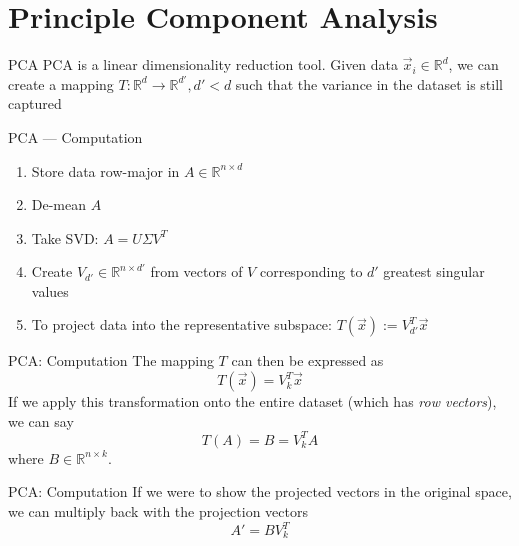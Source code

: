 
	\section{Principle Component Analysis}

	\begin{frame}{PCA}
	PCA is a linear dimensionality reduction tool. Given data $\vec{x}_i \in \mathbb{R}^d$, we can create a mapping $T : \mathbb{R}^d \rightarrow \mathbb{R}^{d'}, d' < d$ such that the variance in the dataset is still captured
	\end{frame}

	\begin{frame}{PCA --- Computation}
		\begin{enumerate}[<+->]
			\item Store data row-major in $A \in \mathbb{R}^{n \times d}$
			\item De-mean $A$
			\item Take SVD: $A = U \Sigma V^T$
			\item Create $V_{d'} \in \mathbb{R}^{n \times d'}$ from vectors of $V$ corresponding to $d'$ greatest singular values
			\item To project data into the representative subspace: $T(\vec{x}) := V_{d'}^T \vec{x}$
		\end{enumerate}
	\end{frame}

	\begin{frame}{PCA: Computation}
	The mapping $T$ can then be expressed as
	\[ T(\vec{x}) = V_k^T \vec{x} \]
	If we apply this transformation onto the entire dataset (which has \emph{row vectors}), we can say
	\[ T(A) = B = V_k^T A\]
	where $B \in \mathbb{R}^{n \times k}$.
	\end{frame}
	\begin{frame}{PCA: Computation}
	If we were to show the projected vectors in the original space, we can multiply back with the projection vectors
	\[ A' = B V_k^T \]
	\end{frame}

